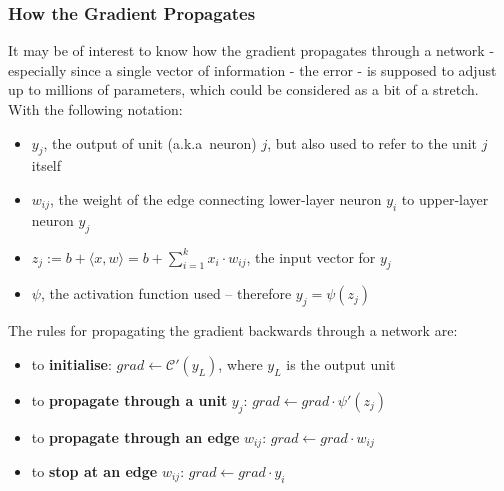 \documentclass[a4paper,11pt]{article}
\begin{document}
\subsubsection{How the Gradient Propagates}

It may be of interest to know how the gradient propagates through a network - especially since a single vector of information - the error - is supposed to adjust up to millions of parameters, which could be considered as a bit of a stretch.\\

With the following notation:
\begin{itemize}
\renewcommand\labelitemi{--}
\item $y_{j}$, the output of unit (a.k.a\ neuron) $j$, but also used to refer to the unit $j$ itself
\item $w_{ij}$, the weight of the edge connecting lower-layer neuron $y_{i}$ to upper-layer neuron $y_{j}$
\item $z_{j} := b+ \langle x,w \rangle = b + \sum\limits_{i=1}^k x_{i}\cdot w_{ij}$, the input vector for $y_{j}$
\item $\psi$, the activation function used -- therefore $y_{j} = \psi(z_{j})$ \\
\end{itemize}

The rules for propagating the gradient backwards through a network are:
\begin{itemize}
\renewcommand\labelitemi{--}
\item to \textbf{initialise}: $grad \leftarrow \mathcal{C}'(y_{L})$, where $y_{L}$ is the output unit
\item to \textbf{propagate through a unit} $y_{j}$: $grad \leftarrow grad \cdot \psi'(z_{j})$
\item to \textbf{propagate through an edge} $w_{ij}$: $grad \leftarrow grad \cdot w_{ij}$
\item to \textbf{stop at an edge} $w_{ij}$: $grad \leftarrow grad \cdot y_{i}$ \\
\end{itemize}
\end{document}

